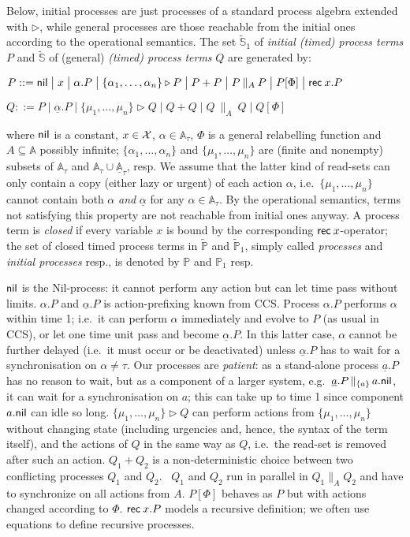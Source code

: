 \documentclass[copyright,creativecommons]{eptcs}
\newcommand{\Nil}{{\sf nil}}
\newcommand{\gor}{\;\big|\;}
\newcommand{\rec}{{\sf rec} \:}
\newcommand{\B}{{\mathbb A}} \newcommand{\Bt}{\B_{\tau}} \newcommand{\X}{{\cal X}}
\newcommand{\Pg}{\tilde{\PG}}
\newcommand{\PG}{{\mathbb P}}
\newcommand{\Sg}{\tilde{\SG}}
\newcommand{\SG}{{\mathbb S}}
\newcommand{\rop}{\triangleright}
\begin{document}
Below, initial processes are just processes of a standard process algebra
extended with $\rop$, while general processes are those reachable from the
initial ones according to the operational semantics.
The set $\Sg_1$ of {\em initial (timed) process terms} $P$ and $\Sg$ of
(general) {\em (timed) process terms} $Q$ are generated by:


\vspace{0.1cm}
\hspace{3cm}
$P::= \Nil \gor x \gor \alpha. P \gor \{\alpha_1, \dots ,\alpha_n\} \rop P
\gor P+P \gor P \:\|_A \: P \gor P[\Phi] \gor \rec x.P$

\hspace{3.2cm} 
$Q ::= P \gor \underline{\alpha} .P \gor \{\mu_1, \dots ,\mu_n\}
\triangleright Q \gor Q+Q \gor Q \:\|_A\: Q \gor Q[\Phi] $

\vspace{0.1cm}

where  $\Nil$ is a constant, $x \in \X$, $\alpha \in \Bt$,  $\Phi$ is a
general relabelling function and $A\subseteq \B$ possibly infinite;
$\{\alpha_1, \ldots,\alpha_n\}$   and $\{\mu_1,\ldots, \mu_n\}$ are (finite
and nonempty) subsets of  $\Bt$ and $\Bt \cup \underline{\B}_\tau$, resp.
We assume that the latter kind of read-sets can only contain a copy (either
lazy or urgent) of each action $\alpha$, i.e.\ $\{\mu_1,\ldots, \mu_n\}$
cannot contain both $\alpha$ {\em and} $\underline{\alpha}$ for any $\alpha
\in \Bt$. By the operational semantics, terms not satisfying this property
are not reachable from initial ones anyway.  
A process term is {\em closed} if every variable $x$ is bound by the
corresponding $\rec x$-operator; the set of closed timed process terms in
$\Pg$ and $\Pg_1$, simply called {\em processes} and {\em initial
processes} resp., is denoted by $\PG$ and $\PG_1$ resp.


$\Nil$ is the Nil-process: it cannot perform any action but can let time
pass without limits. $\alpha.P$ and $\underline{\alpha}.P$ is
action-prefixing known from CCS. Process $\alpha.P$ performs $\alpha$
within time 1; i.e.\ it can perform $\alpha$ immediately and evolve to $P$
(as usual in CCS), or let one time unit pass and become
$\underline{\alpha}.P$. In this latter case, $\alpha$ cannot be further
delayed (i.e.\ it must occur or be deactivated) unless
$\underline{\alpha}.P$ has to wait for a synchronisation on $\alpha \neq
\tau$. Our processes are {\em patient}: as a stand-alone process
$\underline{a}.P$ has no reason to wait, but as a component of a larger
system, e.g.\ $\underline{a}.P \,\|_{\{a\}}\, a.\Nil$, it can wait for a
synchronisation on $a$; this can take up to time 1 since component $a.\Nil$
can idle so long. $\{\mu_1,\ldots,\mu_n\} \rop Q$ can perform actions from
$\{\mu_1,\ldots,\mu_n\}$ without changing state (including urgencies and,
hence, the syntax of the term itself), and the actions of $Q$ in the same
way as $Q$, i.e.\ the read-set is removed after such an action. $Q_1 + Q_2$
is a non-deterministic choice between two conflicting processes $Q_1$ and
$Q_2$. \ $Q_1$ and $Q_2$ run in parallel in $Q_1\|_A Q_2$ and have to
synchronize on all actions from $A$. $P[\Phi]$ behaves as $P$ but with
actions changed according to  $\Phi$. $\rec x. P$ models a recursive
definition; we often use equations to define recursive processes. 
\end{document}

